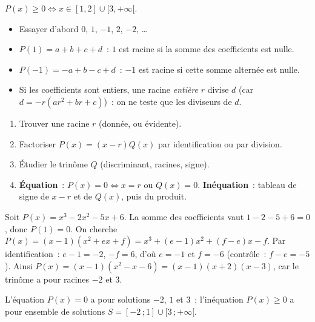 \begin{ex}[Signe de $P(x) = (x-1)(x-2)(x-3)$]
\begin{center}
\end{center}
$P(x) \geq 0 \Leftrightarrow x \in [1,2]\cup[3,+\infty[$.
\end{ex}

\begin{methode}
\begin{itemize}
  \item Essayer d'abord $0$, $1$, $-1$, $2$, $-2$, \ldots
  \item $P(1)=a+b+c+d$~: $1$ est racine si la somme des coefficients est nulle.
  \item $P(-1)=-a+b-c+d$~: $-1$ est racine si cette somme altern\'ee est nulle.
  \item Si les coefficients sont entiers, une racine \emph{enti\`ere} $r$ divise $d$
        (car $d=-r(ar^2+br+c)$)~: on ne teste que les diviseurs de $d$.
\end{itemize}
\end{methode}

\begin{methode}
\begin{enumerate}
  \item Trouver une racine $r$ (donn\'ee, ou \'evidente).
  \item Factoriser $P(x)=(x-r)Q(x)$ par identification ou par division.
  \item \'Etudier le trin\^ome $Q$ (discriminant, racines, signe).
  \item \textbf{\'Equation}~: $P(x)=0\Leftrightarrow x=r$ ou $Q(x)=0$.
        \textbf{In\'equation}~: tableau de signe de $x-r$ et de $Q(x)$, puis du produit.
\end{enumerate}
\end{methode}

\begin{ex}
Soit $P(x)=x^3-2x^2-5x+6$. La somme des coefficients vaut $1-2-5+6=0$, donc $P(1)=0$.
On cherche $P(x)=(x-1)(x^2+ex+f)=x^3+(e-1)x^2+(f-e)x-f$.
Par identification~: $e-1=-2$, $-f=6$, d'o\`u $e=-1$ et $f=-6$ (contr\^ole~:
$f-e=-5$). Ainsi $P(x)=(x-1)(x^2-x-6)=(x-1)(x+2)(x-3)$, car le trin\^ome a
pour racines $-2$ et $3$.
\begin{center}
\end{center}
L'\'equation $P(x)=0$ a pour solutions $-2$, $1$ et $3$~;
l'in\'equation $P(x)\geq0$ a pour ensemble de solutions $S=[-2\,;1]\cup[3\,;+\infty[$.
\end{ex}

